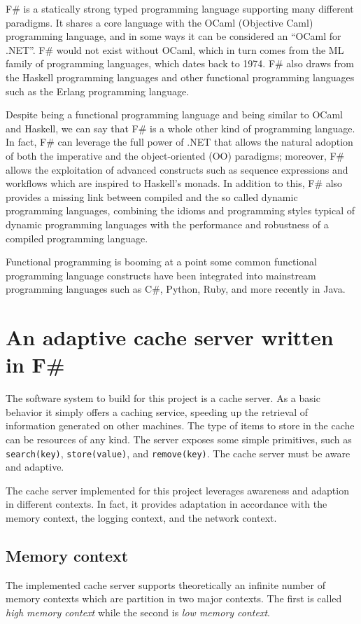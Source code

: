 \documentclass[11pt,a4paper]{article}
\begin{document}
F\# is a statically strong typed programming language supporting many different paradigms. It shares a core language with the OCaml (Objective Caml) programming language, and in some ways it can be considered an ``OCaml for .NET''. F\# would not exist without OCaml, which in turn comes from the ML family of programming languages, which dates back to 1974. F\# also draws from the Haskell programming languages and other functional programming languages such as the Erlang programming language.

Despite being a functional programming language and being similar to OCaml and Haskell, we can say that F\# is a whole other kind of programming language. In fact, F\# can leverage the full power of .NET that allows the natural adoption of both the imperative and the object-oriented (OO) paradigms; moreover, F\# allows the exploitation of advanced constructs such as sequence expressions and workflows which are inspired to Haskell's monads. In addition to this, F\# also provides a missing link between compiled and the so called dynamic programming languages, combining the idioms and programming styles typical of dynamic programming languages with the performance and robustness of a compiled programming language.

Functional programming is booming at a point some common functional programming language constructs have been integrated into mainstream programming languages such as C\#, Python, Ruby, and more recently in Java.

\section{An adaptive cache server written in F\#}
\label{section:work}
The software system to build for this project is a cache server. As a basic behavior it simply offers a caching service, speeding up the retrieval of information generated on other machines. The type of items to store in the cache can be resources of any kind. The server exposes some simple primitives, such as \texttt{search(key)}, \texttt{store(value)}, and \texttt{remove(key)}. The cache server must be aware and adaptive.

The cache server implemented for this project leverages awareness and adaption in different contexts. In fact, it provides adaptation in accordance with the memory context, the logging context, and the network context.

\subsection{Memory context}
\label{section:work:memory-context}
The implemented cache server supports theoretically an infinite number of memory contexts which are partition in two major contexts. The first is called \textit{high memory context} while the second is \textit{low memory context}.
\end{document}
